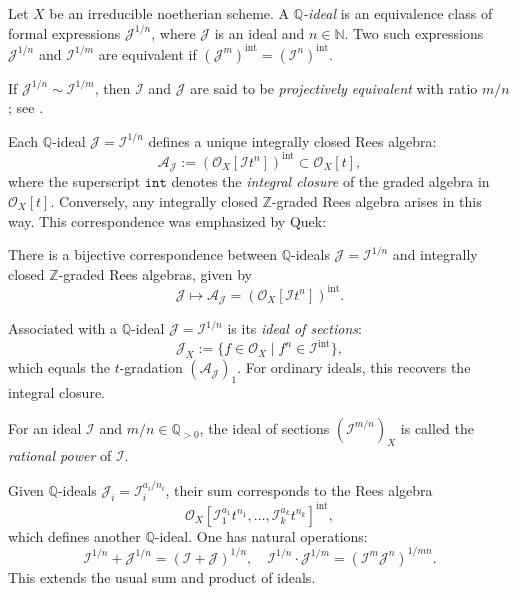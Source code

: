 \documentclass{amsart}
\newcommand{\QQ}{{\mathbb{Q}}}
\newcommand{\NN}{{\mathbb{N}}}
\newcommand{\ZZ}{{\mathbb{Z}}}
\newcommand{\cA}{{\mathcal A}}
\newcommand{\cI}{{\mathcal I}}
\newcommand{\cJ}{{\mathcal J}}
\newcommand{\cO}{{\mathcal O}}
\newcommand{\inte}{{\operatorname{int}}}
\begin{document}
\begin{definition}
Let $X$ be an irreducible noetherian scheme. A \emph{$\QQ$-ideal} is an equivalence class of formal expressions $\cJ^{1/n}$, where $\cJ$ is an ideal and $n \in \NN$. Two such expressions $\cJ^{1/n}$ and $\cI^{1/m}$ are equivalent if $(\cJ^m)^\inte = (\cI^n)^\inte$.
\end{definition}

\begin{remark}
If $\cJ^{1/n} \sim \cI^{1/m}$, then $\cI$ and $\cJ$ are said to be \emph{projectively equivalent} with ratio $m/n$; see \cite{Rush07}.
\end{remark}

Each $\QQ$-ideal $\cJ = \cI^{1/n}$ defines a unique integrally closed Rees algebra:
\[
\cA_\cJ := (\cO_X[\cI t^n])^\inte \subset \cO_X[t],
\]
where the superscript \( \texttt{int} \) denotes the {\it integral closure} of the graded algebra in \( \mathcal{O}_X[t] \). %
Conversely, any integrally closed $\ZZ$-graded Rees algebra arises in this way. This correspondence was emphasized by Quek:

\begin{proposition}
There is a bijective correspondence between $\QQ$-ideals $\cJ = \cI^{1/n}$ and integrally closed $\ZZ$-graded Rees algebras, given by
\[
\cJ \mapsto \cA_\cJ = (\cO_X[\cI t^n])^\inte.
\]
\end{proposition}

Associated with a $\QQ$-ideal $\cJ = \cI^{1/n}$ is its \emph{ideal of sections}:
\[
\cJ_X := \{f \in \cO_X \mid f^n \in \cI^\inte\},
\]
which equals the $t$-gradation $(\cA_\cJ)_1$. For ordinary ideals, this recovers the integral closure.

\begin{definition}[\cite{HS06}]
For an ideal $\cI$ and $m/n \in \QQ_{>0}$, the ideal of sections $(\cI^{m/n})_X$ is called the \emph{rational power} of $\cI$.
\end{definition}

Given $\QQ$-ideals $\cJ_i = \cI_i^{a_i/n_i}$, their sum corresponds to the Rees algebra
\[
\cO_X[\cI_1^{a_1} t^{n_1}, \ldots, \cI_k^{a_k} t^{n_k}]^\inte,
\]
which defines another $\QQ$-ideal. One has natural operations:
\[
\cI^{1/n} + \cJ^{1/n} = (\cI + \cJ)^{1/n}, \quad
\cI^{1/n} \cdot \cJ^{1/m} = (\cI^m \cJ^n)^{1/mn}.
\]
This extends the usual sum and product of ideals.
\end{document}
